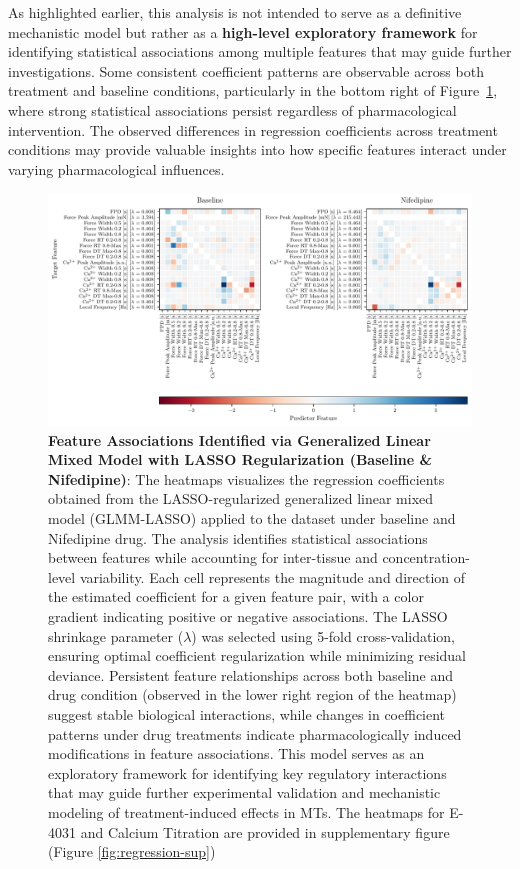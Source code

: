 \documentclass{report}
\begin{document}
    As highlighted earlier, this analysis is not intended to serve as a definitive mechanistic model but rather as a \textbf{high-level exploratory framework} for identifying statistical associations among multiple features that may guide further investigations. Some consistent coefficient patterns are observable across both treatment and baseline conditions, particularly in the bottom right of Figure~\ref{fig:regression}, where strong statistical associations persist regardless of pharmacological intervention. The observed differences in regression coefficients across treatment conditions may provide valuable insights into how specific features interact under varying pharmacological influences.

    \begin{figure}
        \centering
        \includegraphics[width=1\textwidth, keepaspectratio]{plots/chapter_8/coefficient_heatmap_pair.pdf}
        \caption[Feature Associations Identified via Generalized Linear Mixed Model with LASSO Regularization (Baseline \& Nifedipine)]{\textbf{Feature Associations Identified via Generalized Linear Mixed Model with LASSO Regularization (Baseline \& Nifedipine)}:
            The heatmaps visualizes the regression coefficients obtained from the LASSO-regularized generalized linear mixed model (GLMM-LASSO) applied to the dataset under baseline and  Nifedipine drug. The analysis identifies statistical associations between features while accounting for inter-tissue and concentration-level variability. Each cell represents the magnitude and direction of the estimated coefficient for a given feature pair, with a color gradient indicating positive or negative associations. The LASSO shrinkage parameter (\(\lambda\)) was selected using 5-fold cross-validation, ensuring optimal coefficient regularization while minimizing residual deviance. Persistent feature relationships across both baseline and drug condition (observed in the lower right region of the heatmap) suggest stable biological interactions, while changes in coefficient patterns under drug treatments indicate pharmacologically induced modifications in feature associations. This model serves as an exploratory framework for identifying key regulatory interactions that may guide further experimental validation and mechanistic modeling of treatment-induced effects in MTs. The heatmaps for E-4031 and Calcium Titration are provided in supplementary figure (Figure \ref{fig:regression-sup})}
        \label{fig:regression}
    \end{figure}
    
\end{document}
